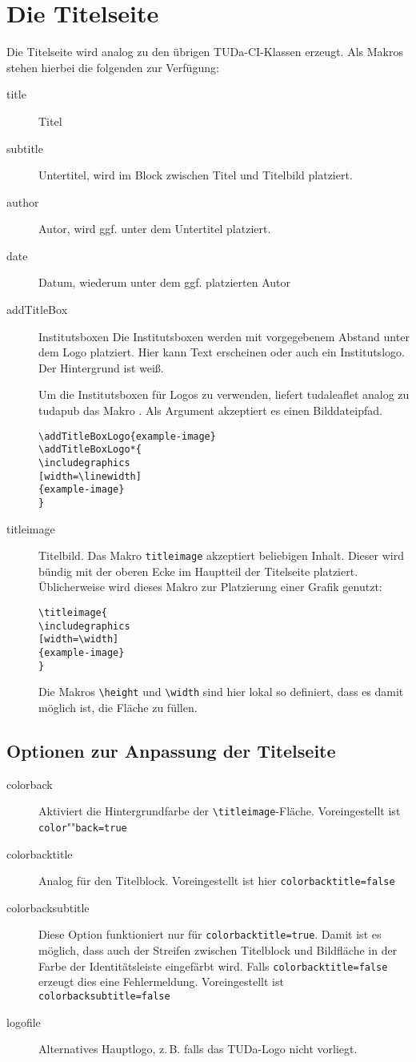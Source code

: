 \documentclass[
	german,%
	accentcolor=9c,%
]{tudaleaflet}
\newcommand*{\code}[1]{\texttt{#1}}
\newcommand*{\cls}[1]{\textsf{#1}}
\begin{document}
\section{Die Titelseite}
Die Titelseite wird analog zu den übrigen TUDa-CI-Klassen erzeugt. Als Makros stehen hierbei die folgenden zur Verfügung:
\begin{description}
	\item[title] Titel
	\item[subtitle] Untertitel, wird im Block zwischen Titel und Titelbild platziert.
	\item[author] Autor, wird ggf. unter dem Untertitel platziert.
	\item[date] Datum, wiederum unter dem ggf. platzierten Autor
	\item[addTitleBox] Institutsboxen
	      Die Institutsboxen werden mit vorgegebenem Abstand unter dem Logo platziert. Hier kann Text erscheinen oder auch ein Institutslogo. Der Hintergrund ist weiß.

	      Um die Institutsboxen für Logos zu verwenden, liefert \cls{tudaleaflet} analog zu \cls{tudapub} das Makro \code{\addTitleBoxLogo}. Als Argument akzeptiert es einen Bilddateipfad.
\begin{verbatim}
\addTitleBoxLogo{example-image}
\addTitleBoxLogo*{
\includegraphics
[width=\linewidth]
{example-image}
}
\end{verbatim}
	\item[titleimage] Titelbild. Das Makro \code{titleimage} akzeptiert beliebigen Inhalt. Dieser wird bündig mit der oberen Ecke im Hauptteil der Titelseite platziert. Üblicherweise wird dieses Makro zur Platzierung einer Grafik genutzt:
\begin{verbatim}
\titleimage{
\includegraphics
[width=\width]
{example-image}
}
\end{verbatim}
	      Die Makros \verb+\height+ und \verb+\width+ sind hier lokal so definiert, dass es damit möglich ist, die Fläche zu füllen.
\end{description}

\subsection{Optionen zur Anpassung der Titelseite}
\begin{description}
	\item[colorback] Aktiviert die Hintergrundfarbe der \verb+\titleimage+-Fläche. Voreingestellt ist \verb+color+""\verb+back=true+
	\item[colorbacktitle] Analog für den Titelblock. Voreingestellt ist hier \verb+colorbacktitle=false+
	\item[colorbacksubtitle] Diese Option funktioniert nur für \verb+colorbacktitle=true+. Damit ist es möglich, dass auch der Streifen zwischen Titelblock und Bildfläche in der Farbe der Identitätsleiste eingefärbt wird. Falls \verb+colorbacktitle=false+ erzeugt dies eine Fehlermeldung. Voreingestellt ist \verb+colorbacksubtitle=false+
	\item[logofile] Alternatives Hauptlogo, z.\,B. falls das TUDa-Logo nicht vorliegt.
\end{description}
\end{document}

